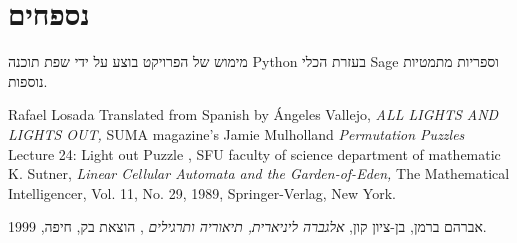 \documentclass[12pt,leqno]{article}
\theoremstyle{theoremdd}
\begin{document}
\newpage
\section{נספחים}
מימוש של הפרויקט בוצע על ידי 
שפת תוכנה 
{Python}
בעזרת הכלי
{Sage}
וספריות מתמטיות נוספות.

\newpage
\begin{thebibliography}{99}
\begin{english}
Rafael Losada
Translated from Spanish by Ángeles Vallejo,
\emph{
    ALL LIGHTS AND LIGHTS OUT,
}
SUMA magazine’s 
Jamie Mulholland
\emph{
    Permutation Puzzles
}
Lecture 24: Light out Puzzle , SFU faculty of science department of mathematic
K. Sutner, \emph{Linear Cellular Automata and the Garden-of-Eden,} The Mathematical Intelligencer, Vol. 11, No. 29, 1989, Springer-Verlag, New York.		
\end{english}
אברהם ברמן, בן-ציון קון, 
\emph{
אלגברה ליניארית, תיאוריה ותרגילים
}
, הוצאת בק, חיפה, 1999.
\end{thebibliography}
\end{document}
